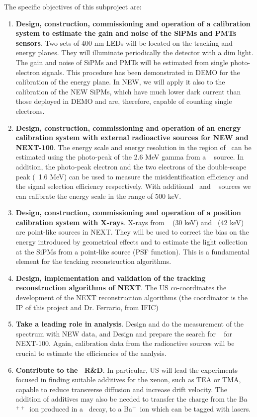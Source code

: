 The specific objectives of this subproject are:
\begin{enumerate}
\item {\bf Design, construction, commissioning and operation of a calibration system to estimate the gain and noise of the SiPMs and PMTs sensors}. Two sets of 400 nm LEDs will be located on the tracking and energy planes. They will illuminate periodically the detector with a dim light. The gain and noise of SiPMs and PMTs will be estimated from single photo-electron signals. This procedure has been demonstrated in DEMO for the calibration of the energy plane. In NEW, we will apply it also to the calibration of the NEW SiPMs, which have much lower dark current than those deployed in DEMO and are, therefore, capable of counting single electrons.

\item {\bf Design, construction, commissioning and operation of an energy calibration system with external radioactive sources for NEW and NEXT-100}.
The energy scale and energy resolution in the region of \Qbb ~can be estimated using the photo-peak of the 2.6 MeV gamma from a \Tl~  source. In addition, the photo-peak electron and the two electrons of the double-scape peak (~1.6 MeV) can be used to measure the misidentification efficiency and the signal selection efficiency respectively. With additional 
\NA\ and \CS~ sources we can calibrate the energy scale in the range of 500 keV.

\item {\bf Design, construction, commissioning and operation of a position calibration system with X-rays}. X-rays from \Xe~ (30 keV) and \KR ~(42 keV) are point-like sources in NEXT.
They will be used to correct the bias on the energy introduced by geometrical effects and to estimate the light collection at the SiPMs from a point-like source (PSF function). This is a fundamental element for the tracking reconstruction algorithms. 

\item {\bf Design, implementation and validation of the tracking reconstruction algorithms of NEXT}.  The US co-coordinates the development of the NEXT reconstruction algorithms (the coordinator is the IP of this project and Dr. Ferrario, from IFIC) 


\item {\bf Take a leading role in analysis}. Design and do the measurement of the \bb~ spectrum with NEW data, and Design and prepare the search for \bbonu~  for NEXT-100. 
Again, calibration data from the radioactive sources will be crucial to estimate the efficiencies of the analysis.

\item {\bf Contribute to the \BATA\ R\&D}. In particular, US will lead the experiments focused in finding suitable additives for the xenon, such as TEA or TMA, capable to reduce transverse diffusion and increase drift velocity. The addition of additives may also be needed to transfer the charge from the Ba$^{++}$~ion produced in a \bb\ decay, to a Ba$^+$~ion which can be tagged with lasers.  
\end{enumerate}


